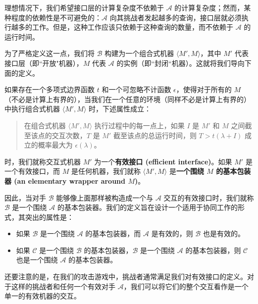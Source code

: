 理想情况下，我们希望接口层的计算复杂度不依赖于 $\mathcal{A}$ 的计算复杂度；然而，某种程度的依赖性是不可避免的：$\mathcal{A}$ 向其挑战者发起越多的查询，接口层就必须执行越多的工作。但是，这种工作应该只依赖于这种查询的数量，而不依赖于 $\mathcal{A}$ 的运行时间。

为了严格定义这一点，我们将 $\mathcal{B}$ 构建为一个组合式机器 $\langle M',M\rangle$，其中 $M'$ 代表接口层（即``开放"机器），$M$ 代表 $\mathcal{A}$ 的实例（即``封闭“机器）。这就将我们导向下面的定义。

\begin{definition}[基本包装器]\label{def:2-12}
如果存在一个多项式边界函数 $t$ 和一个可忽略不计函数 $\epsilon$，使得对于所有的 $M$（不必是计算上有界的），当我们在一个任意的环境（同样不必是计算上有界的）中执行组合式机器 $\langle M',M\rangle$ 时，下述属性成立：
\begin{quote}
在组合式机器 $\langle M',M\rangle$ 执行过程中的每一点上，如果 $I$ 是 $M'$ 和 $M$ 之间截至该点的交互次数，$T$ 是 $M'$ 截至该点的总运行时间，则 $T>t(\lambda+I)$ 成立的概率最大为 $\epsilon(\lambda)$。
\end{quote}
时，我们就称交互式机器 $M'$ 为一个\textbf{有效接口 (efficient interface)}。如果 $M'$ 是一个有效接口，而 $M$ 是任何机器，我们就称 $\langle M',M\rangle$ 是\textbf{一个围绕 $M$ 的基本包装器 (an elementary wrapper around $M$)}。
\end{definition}

因此，当对手 $\mathcal{B}$ 能够像上面那样被构造成一个与 $\mathcal{A}$ 交互的有效接口时，我们就称 $\mathcal{B}$ 是一个围绕 $\mathcal{A}$ 的基本包装器。我们的定义旨在设计一个适用于协同工作的形式，其突出的属性是：
\begin{itemize}
	\item 如果 $\mathcal{B}$ 是一个围绕 $\mathcal{A}$ 的基本包装器，而 $\mathcal{A}$ 是有效的，则 $\mathcal{B}$ 也是有效的。
	\item 如果 $\mathcal{C}$ 是一个围绕 $\mathcal{B}$ 的基本包装器，$\mathcal{B}$ 是一个围绕 $\mathcal{A}$ 的基本包装器，则 $\mathcal{C}$ 也是一个围绕 $\mathcal{A}$ 的基本包装器。
\end{itemize}

还要注意的是，在我们的攻击游戏中，挑战者通常满足我们对有效接口的定义。对于这样的挑战者和任何一个有效对手 $\mathcal{A}$，我们可以将它们的整个交互看作是一个单一的有效机器的交互。

